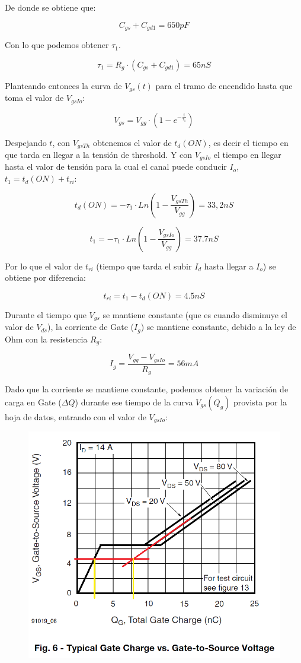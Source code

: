 \documentclass[e4_tp1_main.tex]{subfiles}
\begin{document}
De donde se obtiene que:

\[
C_{gs} + C_{gd1} = 650pF
\]

Con lo que podemos obtener $\tau_1$.

\[
\tau_1 = R_g \cdot (C_{gs} + C_{gd1}) = 65nS
\]

Planteando entonces la curva de $V_{gs}(t)$ para el tramo de encendido hasta que toma el valor de $V_{gsIo}$:

\[
V_{gs} = V_{gg} \cdot (1 - e^{-\frac{t}{\tau_1}})
\]

Despejando $t$, con $V_{gsTh}$ obtenemos el valor de $t_d(ON)$, es decir el tiempo en que tarda en llegar a la tensión de threshold. Y con $V_{gsIo}$ el tiempo en llegar hasta el valor de tensión para la cual el canal puede conducir $I_o$, $t_1 = t_d(ON) + t_{ri}$:

\[
t_d(ON) = -\tau_1 \cdot Ln\left( 1 - \frac{V_{gsTh}}{V_{gg}} \right) = 33,2nS
\]

\[
t_1 = -\tau_1 \cdot Ln\left( 1 - \frac{V_{gsIo}}{V_{gg}} \right) = 37.7nS
\]

Por lo que el valor de $t_{ri}$ (tiempo que tarda el subir $I_d$ hasta llegar a $I_o$) se obtiene por diferencia:

\[
t_{ri} = t_1 - t_d(ON)= 4.5nS
\]

Durante el tiempo que $V_{gs}$ se mantiene constante (que es cuando disminuye el valor de $V_{ds}$), la corriente de Gate ($I_g$) se mantiene constante, debido a la ley de Ohm con la resistencia $R_g$:

\[
I_g = \frac{V_{gg} - V_{gsIo}}{R_g} = 56mA
\] 

Dado que la corriente se mantiene constante, podemos obtener la variación de carga en Gate ($\Delta Q$) durante ese tiempo de la curva $V_{gs}(Q_g)$ provista por la hoja de datos, entrando con el valor de $V_{gsIo}$:

\begin{figure}[H]
\centering
\includegraphics[width=0.5\linewidth]{Images/Ej1-GateCharge.png}
\end{figure}
\end{document}
